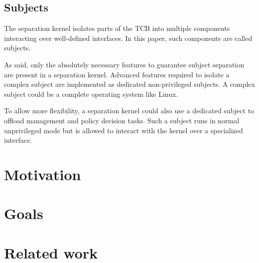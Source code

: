 \subsection{Subjects}
The separation kernel isolates parts of the TCB into multiple
components interacting over well-defined interfaces. In this
paper, such components are called subjects.

As said, only the absolutely necessary features to guarantee subject separation
are present in a separation kernel. Advanced features required to isolate a
complex subject are implemented as dedicated non-privileged subjects. A complex
subject could be a complete operating system like Linux.

To allow more flexibility, a separation kernel could also use a dedicated
subject to offload management and policy decision tasks. Such a subject runs in
normal unprivileged mode but is allowed to interact with the kernel over a
specialized interface.

\section{Motivation}
\section{Goals}
\section{Related work}
